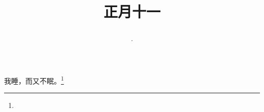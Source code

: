 \title{\date[d=20,m=2,y=2024][year:cn-y,年,month:cn,day:cn,日,·,weekday]·正月十一 }
我睡，而又不眠。\footnote{ }

